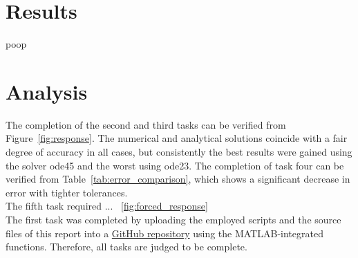 \documentclass{article}
\begin{document}
	\section*{Results}
	poop

	\section*{Analysis}
	The completion of the second and third tasks can be verified from Figure~\ref*{fig:response}. The numerical and analytical solutions coincide with a fair degree of accuracy in all cases, but consistently the best results were gained using the solver ode45 and the worst using ode23. The completion of task four can be verified from Table~\ref{tab:error_comparison}, which shows a significant decrease in error with tighter tolerances.\\
	
	The fifth task required ... ~\ref{fig:forced_response} \\
	
	The first task was completed by uploading the employed scripts and the source files of this report into a \href{https://github.com/VesaVilleHurskainen/cmim2018}{GitHub repository} using the MATLAB-integrated functions. Therefore, all tasks are judged to be complete.
	
\end{document}
